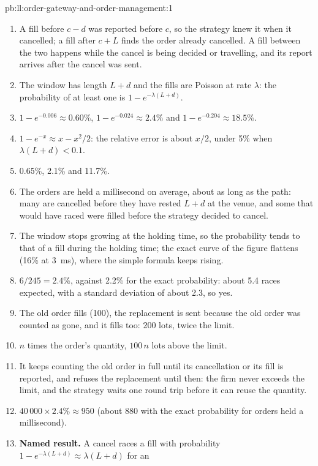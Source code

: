 \begin{solution}{pb:ll:order-gateway-and-order-management:1}
\begin{enumerate}
\item A fill before $c - d$ was reported before $c$, so the strategy knew it when it cancelled; a fill after $c + L$ finds the
order already cancelled. A fill between the two happens while the cancel is being decided or travelling, and its report
arrives after the cancel was sent.
\item The window has length $L + d$ and the fills are Poisson at rate $\lambda$: the probability of at least one is
$1 - e^{-\lambda (L + d)}$.
\item $1 - e^{-0.006} \approx 0.60\%$, $1 - e^{-0.024} \approx 2.4\%$ and $1 - e^{-0.204} \approx 18.5\%$.
\item $1 - e^{-x} \approx x - x^2/2$: the relative error is about $x/2$, under 5\% when $\lambda(L + d) < 0.1$.
\item 0.65\%, 2.1\% and 11.7\%.
\item The orders are held a millisecond on average, about as long as the path: many are cancelled before they have rested
$L + d$ at the venue, and some that would have raced were filled before the strategy decided to cancel.
\item The window stops growing at the holding time, so the probability tends to that of a fill during the holding time; the
exact curve of the figure flattens (16\% at \qty{3}{\milli\second}), where the simple formula keeps rising.
\item $6 / 245 = 2.4\%$, against 2.2\% for the exact probability: about 5.4 races expected, with a standard deviation of about
2.3, so yes.
\item The old order fills (100), the replacement is sent because the old order was counted as gone, and it fills too: 200
lots, twice the limit.
\item $n$ times the order's quantity, $100\,n$ lots above the limit.
\item It keeps counting the old order in full until its cancellation or its fill is reported, and refuses the replacement
until then: the firm never exceeds the limit, and the strategy waits one round trip before it can reuse the quantity.
\item $40\,000 \times 2.4\% \approx 950$ (about 880 with the exact probability for orders held a millisecond).
\item \textbf{Named result.} A cancel races a fill with probability $1 - e^{-\lambda (L + d)} \approx \lambda (L + d)$ for an

\end{enumerate}
\end{solution}
